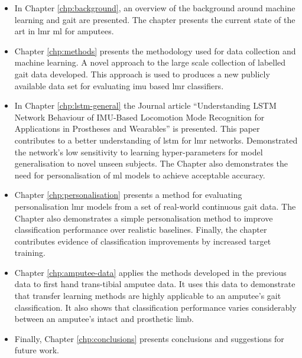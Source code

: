 \begin{itemize}
    \item In Chapter \ref{chp:background}, an overview of the background around machine learning and gait are presented. The chapter presents the current state of the art in \acrlong{lmr} \acrshort{ml} for amputees.
    
    \item Chapter \ref{chp:methods} presents the methodology used for data collection and machine learning. A novel approach to the large scale collection of labelled gait data developed. This approach is used to produces a new publicly available data set for evaluating \acrlong{imu} based \acrshort{lmr} classifiers.
    
    \item In Chapter \ref{chp:lstm-general} the Journal article ``Understanding LSTM Network Behaviour of IMU-Based Locomotion Mode Recognition for Applications in Prostheses and Wearables'' is presented. This paper contributes to a better understanding of \acrlong{lstm} for \acrshort{lmr} networks. Demonstrated the network's low sensitivity to learning hyper-parameters for model generalisation to novel unseen subjects. The Chapter also demonstrates the need for personalisation of \acrshort{ml} models to achieve acceptable accuracy.
    
    \item Chapter \ref{chp:personalisation} presents a method for evaluating personalisation \acrshort{lmr} models from a set of real-world continuous gait data. The Chapter also demonstrates a simple personalisation method to improve classification performance over realistic baselines. Finally, the chapter contributes evidence of classification improvements by increased target training.
    
    \item Chapter \ref{chp:amputee-data} applies the methods developed in the previous data to first hand trans-tibial amputee data. It uses this data to demonstrate that transfer learning methods are highly applicable to an amputee's gait classification. It also shows that classification performance varies considerably between an amputee's intact and prosthetic limb.
    
    \item Finally, Chapter \ref{chp:conclusions} presents conclusions and suggestions for future work.
\end{itemize}
